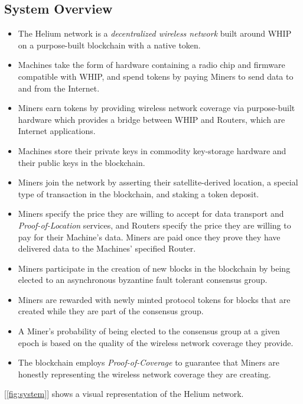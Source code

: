 \documentclass[10pt, nonatbib, nocopyrightspace, reprint]{sigplanconf}
\newcommand{\figref}[1]{[\autoref{#1}]}
\begin{document}
\subsection{System Overview}

\begin{itemize}
    \item The Helium network is a \emph{decentralized wireless network} built around WHIP on a purpose-built blockchain with a native token.
    \item Machines take the form of hardware containing a radio chip and firmware compatible with WHIP, and spend tokens by paying Miners to send data to and from the Internet.
    \item Miners earn tokens by providing wireless network coverage via purpose-built hardware which provides a bridge between WHIP and Routers, which are Internet applications.
    \item Machines store their private keys in commodity key-storage hardware and their public keys in the blockchain.
    \item Miners join the network by asserting their satellite-derived location, a special type of transaction in the blockchain, and staking a token deposit.
    \item Miners specify the price they are willing to accept for data transport and \emph{Proof-of-Location} services, and Routers specify the price they are willing to pay for their Machine's data. Miners are paid once they prove they have delivered data to the Machines' specified Router.
    \item Miners participate in the creation of new blocks in the blockchain by being elected to an asynchronous byzantine fault tolerant consensus group.
    \item Miners are rewarded with newly minted protocol tokens for blocks that are created while they are part of the consensus group.
    \item A Miner's probability of being elected to the consensus group at a given epoch is based on the quality of the wireless network coverage they provide.
    \item The blockchain employs \emph{Proof-of-Coverage} to guarantee that Miners are honestly representing the wireless network coverage they are creating.
\end{itemize}

\figref{fig:system} shows a visual representation of the Helium network.
\end{document}
